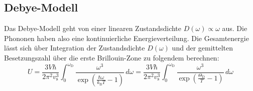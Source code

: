 \subsection{Debye-Modell}
Das Debye-Modell geht von einer linearen Zustandsdichte $D(\omega) \propto \omega$ aus.
Die Phononen haben also eine kontinuierliche Energieverteilung.
Die Gesamtenergie lässt sich über Integration der Zustandsdichte $D(\omega)$ und der gemittelten Besetzungszahl über die erste Brillouin-Zone zu folgendem berechnen:
\begin{equation*}
	U = \frac{3 V \hbar}{2 \pi^2 v_{\text{s}}^3} \int_{0}^{\omega_{\text{D}}} \! \frac{ \omega^3 }{ \exp{ \left(  \frac{\hbar \omega}{k_{\text{B}} T} - 1  \right)} } \, d\omega
	  = \frac{3 V \hbar}{2 \pi^2 v_{\text{s}}^3} \int_{0}^{\omega_{\text{D}}} \! \frac{ \omega^3 }{ \exp{ \left(  \frac{\Theta_{\text{D}}}{ T} - 1  \right)} } \, d\omega
\end{equation*}

\FloatBarrier
